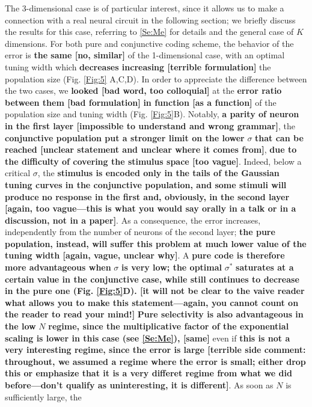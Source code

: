 \documentclass[a4paper]{article}%
\begin{document}
The 3-dimensional case is of particular interest, since it allows us to make a
connection with a real neural circuit in the following section; we briefly
discuss the results for this case, referring to \ref{Se:Me} for details and
the general case of $K$ dimensions. For both pure and conjunctive coding
scheme, the behavior of the error is \textbf{the same [no, similar]} of the
1-dimensional case, with an optimal tuning width which \textbf{decreases
increasing [terrible formulation]} the population size (Fig. \ref{Fig:5}%
A,C,D). In order to appreciate the difference between the two cases, we
\textbf{looked [bad word, too colloquial]} at the \textbf{error ratio between
them [bad formulation]} \textbf{in function [as a function]} of the population
size and tuning width (Fig. \ref{Fig:5}B). Notably, \textbf{a parity of neuron
in the first layer [impossible to understand and wrong grammar]}, the
\textbf{conjunctive population put a stronger limit on the lower }$\sigma
$\textbf{ that can be reached [unclear statement and unclear where it comes
from]}, \textbf{due to the difficulty of covering the stimulus space [too
vague]}. Indeed, below a critical $\sigma$, the \textbf{stimulus is encoded
only in the tails of the Gaussian tuning curves in the conjunctive population,
and some stimuli will produce no response in the first and, obviously, in the
second layer [again, too vague---this is what you would say orally in a talk
or in a discussion, not in a paper]}. As a consequence, the error increases,
independently from the number of neurons of the second layer; \textbf{the pure
population, instead, will suffer this problem at much lower value of the
tuning width [again, vague, unclear why]}. A \textbf{pure code is therefore
more advantageous when }$\sigma$\textbf{ is very low; the optimal }%
$\sigma^{\ast}$\textbf{ saturates at a certain value in the conjunctive case,
while still continues to decrease in the pure one (Fig. \ref{Fig:5}D). [it
will not be clear to the vaive reader what allows you to make this
statement---again, you cannot count on the reader to read your mind!]}
\textbf{Pure selectivity is also advantageous in the low }$N$\textbf{ regime,
since the multiplicative factor of the exponential scaling is lower in this
case (see \ref{Se:Me}), [same]} even if \textbf{this is not a very interesting
regime, since the error is large [terrible side comment: throughout, we
assumed a regime where the error is small; either drop this or emphasize that
it is a very differet regime from what we did before---don't qualify as
uninteresting, it is different]}. As soon as $N$ is sufficiently large, the
\end{document}
